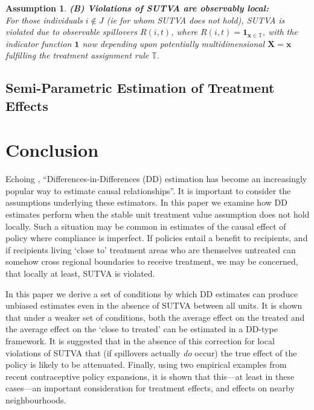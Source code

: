 \documentclass{article}
\newtheorem{assumption}{Assumption}
\begin{document}
\begin{spacing}{1.1}
\begin{assumption}
\label{Sass:SUTVAlM}
\textbf{(B) Violations of SUTVA are observably local:} \\ 
For those individuals $i\notin J$ (ie for whom SUTVA does not hold), SUTVA is
violated due to observable spillovers $R(i,t)$, where 
$R(i,t)=\mathbf{1}_{\mathbf{x}\in \mathbb{T}}$, with the indicator function 
$\mathbf{1}$ now depending upon potentially multidimensional $\mathbf{X=x}$
fulfilling the treatment assignment rule $\mathbb{T}$.
\end{assumption}



\subsection{Semi-Parametric Estimation of Treatment Effects}


\section{Conclusion}
Echoing \citet{Bertrandetal2004}, ``Differences-in-Differences (DD) estimation has 
become an increasingly popular way to estimate causal relationships''.  It is 
important to consider the assumptions underlying these estimators.  
In this paper we examine how DD estimates perform when the stable unit treatment 
value assumption does not hold locally.  Such a situation may be common in estimates 
of the causal effect of policy where compliance is imperfect.  If policies entail a 
benefit to recipients, and if recipients living `close to' treatment areas who are 
themselves untreated can somehow cross regional boundaries to receive treatment, we 
may be concerned, that locally at least, SUTVA is violated.

In this paper we derive a set of conditions by which DD estimates can produce 
unbiased estimates even in the absence of SUTVA between all units.  It is shown
that under a weaker set of conditions, both the average effect on the treated
and the average effect on the `close to treated' can be estimated in a DD-type
framework.  It is suggested that in the absence of this correction for local 
violations of SUTVA that (if spillovers actually \emph{do} occur) the true 
effect of the policy is likely to be attenuated.  Finally, using two empirical 
examples from recent contraceptive policy expansions, it is shown that this---at
least in these cases---an important consideration for treatment effects, and
effects on nearby neighbourhoods.



\end{spacing}
\end{document}
